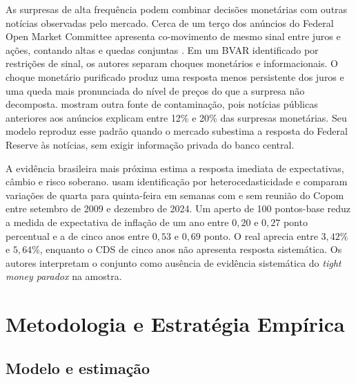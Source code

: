 \documentclass[preprint,authoryear,review,12pt]{elsarticle}
\begin{document}
As surpresas de alta frequência podem combinar decisões monetárias com outras notícias observadas pelo mercado. Cerca de um terço dos anúncios do Federal Open Market Committee apresenta co-movimento de mesmo sinal entre juros e ações, contando altas e quedas conjuntas \citep{jarocinski2020}. Em um BVAR identificado por restrições de sinal, os autores separam choques monetários e informacionais. O choque monetário purificado produz uma resposta menos persistente dos juros e uma queda mais pronunciada do nível de preços do que a surpresa não decomposta. \cite{bauer2023} mostram outra fonte de contaminação, pois notícias públicas anteriores aos anúncios explicam entre 12\% e 20\% das surpresas monetárias. Seu modelo reproduz esse padrão quando o mercado subestima a resposta do Federal Reserve às notícias, sem exigir informação privada do banco central.


A evidência brasileira mais próxima estima a resposta imediata de expectativas, câmbio e risco soberano. \cite{goncalves2025} usam identificação por heterocedasticidade \citep{rigobon2003} e comparam variações de quarta para quinta-feira em semanas com e sem reunião do Copom entre setembro de 2009 e dezembro de 2024. Um aperto de 100 pontos-base reduz a medida de expectativa de inflação de um ano entre $0{,}20$ e $0{,}27$ ponto percentual e a de cinco anos entre $0{,}53$ e $0{,}69$ ponto. O real aprecia entre $3{,}42\%$ e $5{,}64\%$, enquanto o CDS de cinco anos não apresenta resposta sistemática. Os autores interpretam o conjunto como ausência de evidência sistemática do \textit{tight money paradox} na amostra.



\section{Metodologia e Estratégia Empírica}
\label{sec:metodologia}

\subsection{Modelo e estimação}
\end{document}
